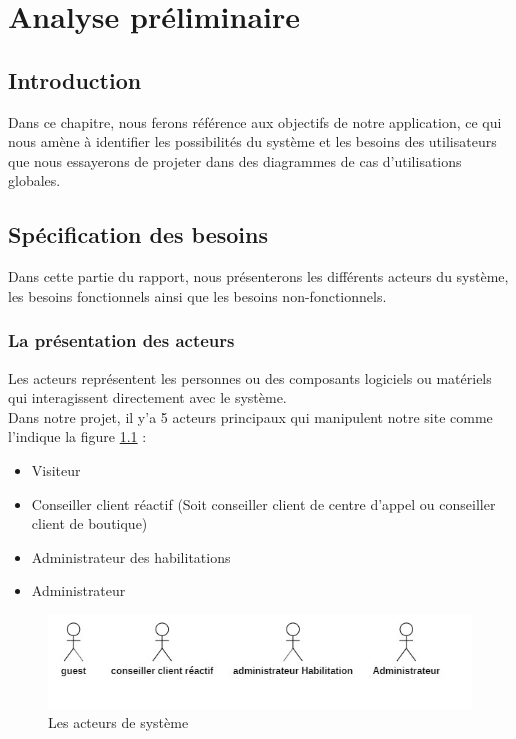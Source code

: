 \chapter{Analyse préliminaire}

\section*{Introduction}
Dans ce chapitre, nous ferons référence aux objectifs de notre application, ce qui nous amène à identifier les possibilités du système et les besoins des utilisateurs que nous essayerons de projeter dans des diagrammes de cas d’utilisations globales.
    
\section[Spécification des besoins]{Spécification des besoins}
Dans cette partie du rapport, nous présenterons les différents acteurs du système, les besoins fonctionnels ainsi que les besoins non-fonctionnels.
\subsection[La présentation des acteurs ]{La présentation des acteurs }
Les acteurs représentent les personnes ou des composants logiciels ou matériels qui interagissent directement avec le système.\\
Dans notre projet, il y’a 5 acteurs principaux qui manipulent notre site comme l'indique la figure \ref{fig:actors} :
\begin{itemize}
	\item Visiteur
	\item Conseiller client réactif (Soit conseiller client de centre d’appel ou conseiller client de boutique)
	\item Administrateur des habilitations
	\item Administrateur
\end{itemize}

\begin{figure}[tbph]
	\centering
	\includegraphics[width=0.7\linewidth]{img/conception/usecases/actors}
	\caption[Les acteurs de système]{Les acteurs de système}
	\label{fig:actors}
\end{figure}

